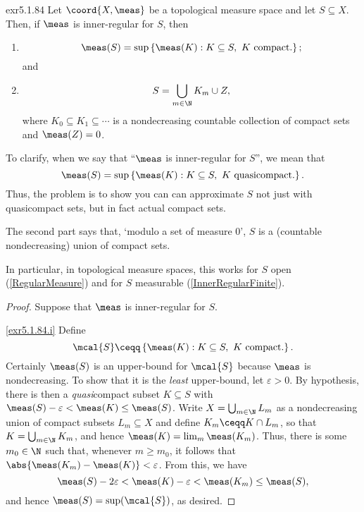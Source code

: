 \begin{prp}{}{exr5.1.84}
Let $\coord{X,\meas}$ be a topological measure space and let $S\subseteq X$.  Then, if $\meas$ is inner-regular for $S$, then
\begin{enumerate}
\item \label{exr5.1.84.i}
\begin{equation}
\meas (S)=\sup \left\{ \meas (K):K\subseteq S,\ K\text{ compact.}\right\} ;
\end{equation}
and
\item \label{exr5.1.84.ii}
\begin{equation}
S=\bigcup _{m\in \N}K_m\cup Z,
\end{equation}
where $K_0\subseteq K_1\subseteq \cdots$ is a nondecreasing countable collection of compact sets and $\meas (Z)=0$.
\end{enumerate}
\begin{rmk}
To clarify, when we say that ``$\meas$ is inner-regular for $S$'', we mean that
\begin{equation}
\meas (S)=\sup \left\{ \meas (K):K\subseteq S,\ K\text{ quasicompact.}\right\} .
\end{equation}
Thus, the problem is to show you can can approximate $S$ not just with quasicompact sets, but in fact actual compact sets.
\end{rmk}
\begin{rmk}
The second part says that, `modulo a set of measure $0$', $S$ is a (countable nondecreasing) union of compact sets. 
\end{rmk}
\begin{rmk}
In particular, in topological measure spaces, this works for $S$ open (\cref{RegularMeasure}) and for $S$ measurable (\cref{InnerRegularFinite}).
\end{rmk}
\begin{proof}
Suppose that $\meas$ is inner-regular for $S$.

\cref{exr5.1.84.i} Define
\begin{equation}
\mcal{S}\ceqq \left\{ \meas (K):K\subseteq S,\ K\text{ compact.}\right\} .
\end{equation}
Certainly $\meas (S)$ is an upper-bound for $\mcal{S}$ because $\meas$ is nondecreasing.  To show that it is the \emph{least} upper-bound, let $\varepsilon >0$.  By hypothesis, there is then a \emph{quasi}compact subset $K\subseteq S$ with $\meas (S)-\varepsilon <\meas (K)\leq \meas (S)$.  Write $X=\bigcup _{m\in \N}L_m$ as a nondecreasing union of compact subsets $L_m\subseteq X$ and define $K_m\ceqq K\cap L_m$, so that $K=\bigcup _{m\in \N}K_m$, and hence $\meas (K)=\lim _m\meas (K_m)$.  Thus, there is some $m_0\in \N$ such that, whenever $m\geq m_0$, it follows that $\abs{\meas (K_m)-\meas (K)}<\varepsilon$.  From this, we have
\begin{equation}
\meas (S)-2\varepsilon <\meas (K)-\varepsilon <\meas (K_m)\leq \meas (S),
\end{equation}
and hence $\meas (S)=\sup (\mcal{S})$, as desired.


\end{proof}
\end{prp}
